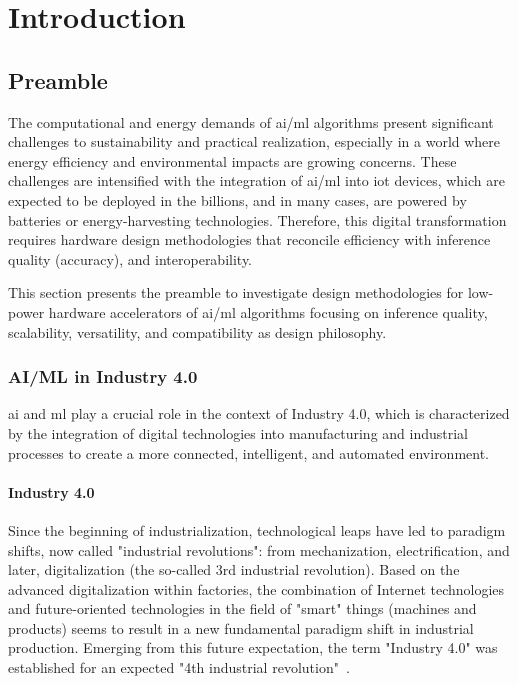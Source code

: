 \chapter{Introduction}\label{chap.intro}
\minitoc
\section{Preamble}

The computational and energy demands of \gls{ai}/\gls{ml} algorithms present significant challenges to sustainability and practical realization, especially in a world where energy efficiency and environmental impacts are growing concerns. These challenges are intensified with the integration of \gls{ai}/\gls{ml} into \gls{iot} devices, which are expected to be deployed in the billions, and in many cases, are powered by batteries or energy-harvesting technologies. Therefore, this digital transformation requires hardware design methodologies that reconcile efficiency with inference quality (accuracy), and interoperability.

This section presents the preamble to investigate design methodologies for low-power hardware accelerators of \gls{ai}/\gls{ml} algorithms focusing on inference quality, scalability, versatility, and compatibility as design philosophy.

\subsection{AI/ML in Industry 4.0}
\gls{ai} and \gls{ml} play a crucial role in the context of Industry 4.0, which is characterized by the integration of digital technologies into manufacturing and industrial processes to create a more connected, intelligent, and automated environment.

\subsubsection{Industry 4.0}
Since the beginning of industrialization, technological leaps have led to paradigm shifts, now called "industrial revolutions": from mechanization, electrification, and later, digitalization (the so-called 3rd industrial revolution). Based on the advanced digitalization within factories, the combination of Internet technologies and future-oriented technologies in the field of "smart" things (machines and products) seems to result in a new fundamental paradigm shift in industrial production. Emerging from this future expectation, the term "Industry 4.0" was established for an expected "4th industrial revolution"~\cite{lasi2014industry}.


